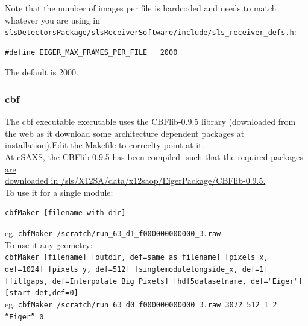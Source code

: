 \documentclass{article}
\begin{document}
Note that the number of images per file is hardcoded and needs to match whatever you are using in {\tt{slsDetectorsPackage/slsReceiverSoftware/include/sls\_receiver\_defs.h}}:
\begin{verbatim}
#define EIGER_MAX_FRAMES_PER_FILE	2000
\end{verbatim}
The default is 2000.

\subsubsection{cbf}
The cbf executable executable uses the CBFlib-0.9.5 library (downloaded from the web as it download some architecture dependent packages at installation).Edit the Makefile to correclty point at it.\\
\underline{At cSAXS, the CBFlib-0.9.5 has been compiled -such that the required packages are}\\\underline{ downloaded in /sls/X12SA/data/x12saop/EigerPackage/CBFlib-0.9.5.}\\ 

To use it for a single module:
\begin{verbatim}
cbfMaker [filename with dir]
\end{verbatim}
eg.
{\tt{cbfMaker /scratch/run\_63\_d1\_f000000000000\_3.raw}}\\

To use it any geometry:\\
{\tt{cbfMaker [filename] [outdir, def=same as filename] [pixels x, def=1024] [pixels y, def=512] [singlemodulelongside\_x, def=1] [fillgaps, def=Interpolate Big Pixels] [hdf5datasetname, def="Eiger"] [start det,def=0]}}\\
eg.
{\tt cbfMaker /scratch/run\_63\_d0\_f000000000000\_3.raw  3072 512 1 2 ``Eiger'' 0}.\\
\end{document}
